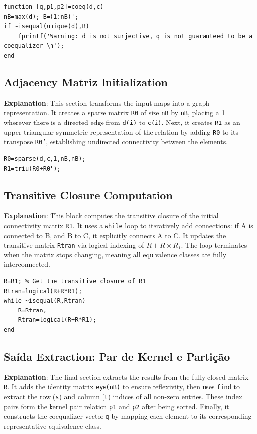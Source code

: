 \begin{lstlisting}[caption={Function Definition and Input Validation}]
function [q,p1,p2]=coeq(d,c)
nB=max(d); B=(1:nB)';
if ~isequal(unique(d),B)
    fprintf('Warning: d is not surjective, q is not guaranteed to be a coequalizer \n');
end
\end{lstlisting}

\subsection{Adjacency Matriz Initialization}
\textbf{Explanation}: This section transforms the input maps into a graph representation. It creates a sparse matrix \texttt{R0} of size \texttt{nB} by \texttt{nB}, placing a 1 wherever there is a directed edge from \texttt{d(i)} to \texttt{c(i)}. Next, it creates \texttt{R1} as an upper-triangular symmetric representation of the relation by adding \texttt{R0} to its transpose \texttt{R0'}, establishing undirected connectivity between the elements.

\begin{lstlisting}[caption={Adjacency Matrix Initialization}]
R0=sparse(d,c,1,nB,nB);
R1=triu(R0+R0');
\end{lstlisting}

\subsection{Transitive Closure Computation}
\textbf{Explanation}: This block computes the transitive closure of the initial connectivity matrix \texttt{R1}. It uses a \texttt{while} loop to iteratively add connections: if A is connected to B, and B to C, it explicitly connects A to C. It updates the transitive matrix \texttt{Rtran} via logical indexing of $R + R \times R_1$. The loop terminates when the matrix stops changing, meaning all equivalence classes are fully interconnected.

\begin{lstlisting}[caption={Transitive Closure Computation}]
R=R1; % Get the transitive closure of R1
Rtran=logical(R+R*R1);
while ~isequal(R,Rtran)
    R=Rtran;
    Rtran=logical(R+R*R1);
end
\end{lstlisting}

\subsection{Saída Extraction: Par de Kernel e Partição}
\textbf{Explanation}: The final section extracts the results from the fully closed matrix \texttt{R}. It adds the identity matrix \texttt{eye(nB)} to ensure reflexivity, then uses \texttt{find} to extract the row (\texttt{s}) and column (\texttt{t}) indices of all non-zero entries. These index pairs form the kernel pair relation \texttt{p1} and \texttt{p2} after being sorted. Finally, it constructs the coequalizer vector \texttt{q} by mapping each element to its corresponding representative equivalence class.

